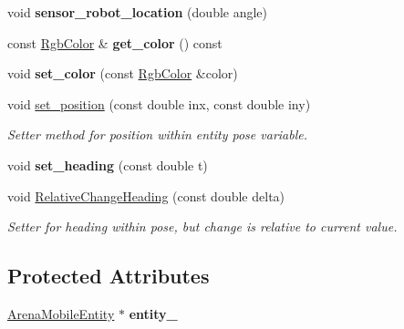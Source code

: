 \begin{DoxyCompactItemize}
\item 
void {\bfseries sensor\+\_\+robot\+\_\+location} (double angle)\hypertarget{classSensor_a97e17a4d4b5fb30bf81d4ad6ee363715}{}\label{classSensor_a97e17a4d4b5fb30bf81d4ad6ee363715}

\item 
const \hyperlink{structRgbColor}{Rgb\+Color} \& {\bfseries get\+\_\+color} () const \hypertarget{classSensor_af5c275ceac411cfcc0903d6d837ed3e7}{}\label{classSensor_af5c275ceac411cfcc0903d6d837ed3e7}

\item 
void {\bfseries set\+\_\+color} (const \hyperlink{structRgbColor}{Rgb\+Color} \&color)\hypertarget{classSensor_a4c7c83edd18efc4a93d3fda798dbceec}{}\label{classSensor_a4c7c83edd18efc4a93d3fda798dbceec}

\item 
void \hyperlink{classSensor_aa38343db9a4da55dde95cb2579204b06}{set\+\_\+position} (const double inx, const double iny)\hypertarget{classSensor_aa38343db9a4da55dde95cb2579204b06}{}\label{classSensor_aa38343db9a4da55dde95cb2579204b06}

\begin{DoxyCompactList}\small\item\em Setter method for position within entity pose variable. \end{DoxyCompactList}\item 
void {\bfseries set\+\_\+heading} (const double t)\hypertarget{classSensor_a95e911a62cef5adfbb0a8ee395cfa881}{}\label{classSensor_a95e911a62cef5adfbb0a8ee395cfa881}

\item 
void \hyperlink{classSensor_ad93b67ee775232e4b6e939fd043f0b84}{Relative\+Change\+Heading} (const double delta)
\begin{DoxyCompactList}\small\item\em Setter for heading within pose, but change is relative to current value. \end{DoxyCompactList}\end{DoxyCompactItemize}
\subsection*{Protected Attributes}
\begin{DoxyCompactItemize}
\item 
\hyperlink{classArenaMobileEntity}{Arena\+Mobile\+Entity} $\ast$ {\bfseries entity\+\_\+}\hypertarget{classSensor_a03559676893c5d485ba8122d5aeb9bd4}{}\label{classSensor_a03559676893c5d485ba8122d5aeb9bd4}

\end{DoxyCompactItemize}


